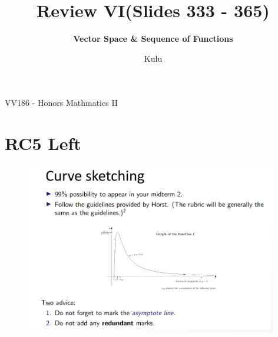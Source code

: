 \documentclass{beamer}
\title{\sffamily Review VI(Slides 333 - 365)}
\subtitle{\textbf{Vector Space \& Sequence of Functions}\\ }
\institute[UM-SJTU JI]{University of Michigan-Shanghai Jiao Tong University Joint Institute}
\author{Kulu}
\newcommand{\myfont}{\rmfamily\normalsize\upshape\mdseries}
\begin{document}
\begin{titlepage}
    \begin{center}
        VV186 - Honors Mathmatics II
    \end{center}
\end{titlepage}
\myfont

\section{RC5 Left}

\begin{frame}
    \begin{figure}[htbp]
        \centering
        \includegraphics[width=11cm]{sketching.png}
    \end{figure}
\end{frame}
\end{document}
